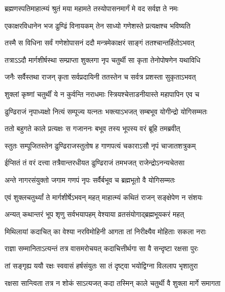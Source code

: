
\twolineshloka
{ब्रह्मणस्पतिमाहात्म्यं श्रुतं मया महामते}
{तस्योपासनमार्गं मे वद सर्वज्ञ ते नमः} %


\twolineshloka
{एकाक्षरविधानेन भज ढुण्ढिं विनायकम्}
{तेन साध्यो गणेशस्ते प्रत्यक्षश्च भविष्यति} %

\twolineshloka
{तस्मै स विधिना सर्वं गणेशोपासनं ददौ}
{मन्त्रमेकाक्षरं साङ्गं ततश्चान्तर्हितोऽभवत्} %

\twolineshloka
{तत्राऽऽदौ मार्गशीर्षस्था सम्प्राप्ता शुक्लगा नृप}
{चतुर्थी सा कृता तेनोपोषणेन यथाविधि} %

\twolineshloka
{जनैः सर्वैस्तथा राजन् कृता सर्वप्रदायिनी}
{ततस्तेन च सर्वत्र प्रशस्ता सुकृताऽभवत्} %

\twolineshloka
{शुक्लां कृष्णां चतुर्थीं ये न कुर्वन्ति नराधमाः}
{स्त्रियश्चेत्ताडनीयास्ते महापापिन एव च} %

\twolineshloka
{ढुण्ढिराजं नृपाध्यक्षो नित्यं सम्पूज्य यत्नतः}
{भक्त्याऽभजत् सम्बभूव योगीन्द्रो योगिसम्मतः} %

\twolineshloka
{ततो बहुगते काले प्रत्यक्षः स गजाननः}
{बभूव तस्य भूपस्य वरं ब्रूहि तमब्रवीत्} %

\twolineshloka
{स्तुतः सम्पूजितस्तेन ढुण्ढिराजस्तुतोष ह}
{गाणपत्यं चकाराऽसौ नृपं चाजातशत्रुकम्} %

\twolineshloka
{ईप्सितं तं वरं दत्त्वा तत्रैवान्तरधीयत}
{ढुण्ढिराजं तमभजत् राजेन्द्रोऽनन्यचेतसा} %

\twolineshloka
{अन्ते नागरसंयुक्तो जगाम गणपं नृपः}
{सर्वैर्बभूव च ब्रह्मभूतो वै योगिसम्मतः} %

\twolineshloka
{एवं शुक्लचतुर्थ्यां ते मार्गशीर्षेऽभवन् महत्}
{माहात्म्यं कथितं राजन् सङ्क्षेपेण न संशयः} %

\twolineshloka
{अन्यत् कथान्तरं भूप श‍ृणु सर्वभयापहम्}
{वेश्याया व्रतसंयोगाद्ब्रह्मभूयकरं महत्} %

\twolineshloka
{मिथिलायां कदाचित् का वेश्या नरविमोहिनी}
{आगता तां निरीक्ष्यैव मोहिताः सकला नराः} %

\twolineshloka
{राज्ञा सम्मानिताऽत्यन्तं तत्र वासमरोचयत्}
{कदाचित्तीर्थगा सा वै सन्दृष्टा रक्षसा पुरः} %

\twolineshloka
{तां सङ्गृह्य ययौ रक्षः स्ववासं हर्षसंयुतः}
{सा तं दृष्ट्वा भयोद्विग्ना विललाप भृशातुरा} %

\twolineshloka
{रक्षसा सान्त्विता तत्र न शोकं साऽत्यजत् कदा}
{तस्मिन् काले चतुर्थी वै शुक्ला मार्गे समागता} %

